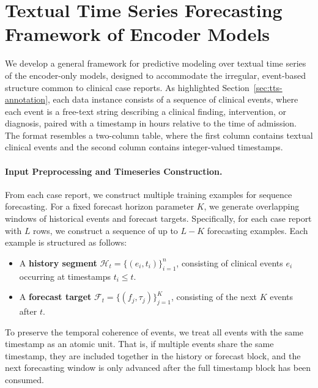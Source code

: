\section{Textual Time Series Forecasting Framework of Encoder Models}
\label{apd:encoder-forecasting}

We develop a general framework for predictive modeling over textual time series of the encoder-only models, designed to accommodate the irregular, event-based structure common to clinical case reports. 
As highlighted Section~\ref{sec:tts-annotation}, each data instance consists of a sequence of clinical events, where each event is a free-text string describing a clinical finding, intervention, or diagnosis, paired with a timestamp in hours relative to the time of admission. 
The format resembles a two-column table, where the first column contains textual clinical events and the second column contains integer-valued timestamps.

\paragraph{Input Preprocessing and Timeseries Construction.}
From each case report, we construct multiple training examples for sequence forecasting. 
For a fixed forecast horizon parameter $K$, we generate overlapping windows of historical events and forecast targets. 
Specifically, for each case report with $L$ rows, we construct a sequence of up to $L-K$ forecasting examples. 
Each example is structured as follows:

\begin{itemize}
    \item A \textbf{history segment} $\mathcal{H}_t = \{(e_i, t_i)\}_{i=1}^{n}$, consisting of clinical events $e_i$ occurring at timestamps $t_i \leq t$.
    \item A \textbf{forecast target} $\mathcal{F}_t = \{(f_j, \tau_j)\}_{j=1}^{K}$, consisting of the next $K$ events after $t$.
\end{itemize}

To preserve the temporal coherence of events, we treat all events with the same timestamp as an atomic unit. 
That is, if multiple events share the same timestamp, they are included together in the history or forecast block, and the next forecasting window is only advanced after the full timestamp block has been consumed.

